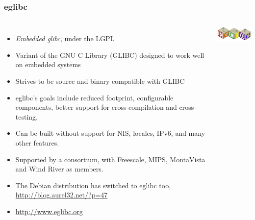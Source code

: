 \begin{frame}
  \frametitle{eglibc}
  \begin{columns}
    \begin{itemize}
    \item {\em Embedded glibc}, under the LGPL
    \item Variant of the GNU C Library (GLIBC) designed to work well on
      embedded systems
    \item Strives to be source and binary compatible with GLIBC
    \item eglibc's goals include reduced footprint, configurable
      components, better support for cross-compilation and
      cross-testing.
    \item Can be built without support for NIS, locales, IPv6, and many
      other features.
    \item Supported by a consortium, with Freescale, MIPS, MontaVista
      and Wind River as members.
    \item The Debian distribution has switched to eglibc too,
      \url{http://blog.aurel32.net/?p=47}
    \item \url{http://www.eglibc.org}
    \end{itemize}
    \includegraphics[width=\textwidth]{slides/sysdev-toolchains-c-libraries/eglibc.png}
  \end{columns}
\end{frame}

